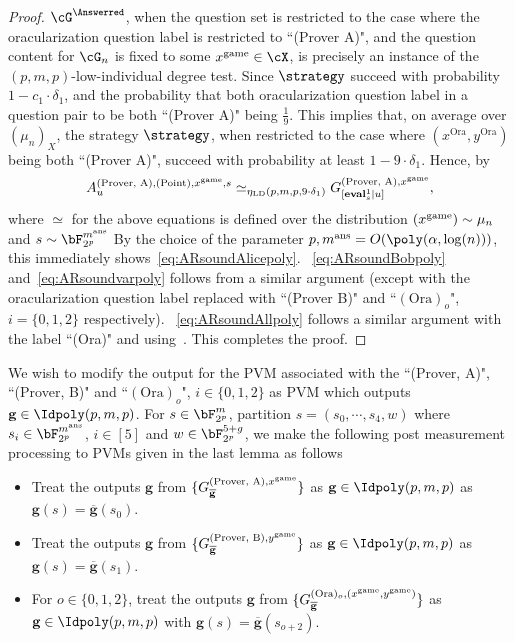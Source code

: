 \begin{proof}
$\cG^{\Answerred}$, when the question set is restricted to the case where the oracularization question label is restricted to ``(Prover A)", and the question content for $\cG_n$ is fixed to some $x^{\game} \in \cX$, is precisely an instance of the $(p,m,p)$-low-individual degree test. Since $\strategy$ succeed with probability $1 - c_1 \cdot \delta_1$, and the probability that both oracularization question label in a question pair to be both ``(Prover A)" being $\frac{1}{9}$. This implies that, on average over $(\mu_n)_X$, the strategy $\strategy$, when restricted to the case where $(x^{\text{Ora}}, y^{\text{Ora}})$ being both ``(Prover A)", succeed with probability at least $1 - 9 \cdot \delta_1$. Hence, by~
\begin{equation*}
 	A^{(\text{Prover, A}), (\text{Point}), x^{\text{game}} ,s}_{u} \simeq_{\mathbf{\eta}_{\text{LD}}(p,m,p,9 \cdot \delta_1)} G_{[\textbf{eval}_{s}^1 | u]}^{(\text{Prover, A}), x^{\text{game}}},
\end{equation*}
where $\simeq$ for the above equations is defined over the distribution $(x^{\text{game}}) \sim \mu_n$ and $s \sim \bF_{2^p}^{m^{\text{ans}}}$
By the choice of the parameter $p, m^{\text{ans}} = O(\poly(\alpha, \log(n)))$, this immediately shows~\eqref{eq:ARsoundAlicepoly}. ~\eqref{eq:ARsoundBobpoly} and~\eqref{eq:ARsoundvarpoly} follows from a similar argument (except with the oracularization question label replaced with ``(Prover B)" and ``$(\text{Ora})_{o}$", $i = \{0,1,2\}$ respectively). ~\eqref{eq:ARsoundAllpoly} follows a similar argument with the label ``(Ora)" and using~. This completes the proof.
\end{proof}
We wish to modify the output for the PVM associated with the ``(Prover, A)", ``(Prover, B)" and ``$(\text{Ora})_{o}$", $i \in \{0,1,2\}$ as PVM which outputs $\textbf{g} \in \Idpoly(p,m,p)$. For $s \in \bF_{2^p}^m$, partition $s = (s_0, \cdots, s_4, w)$ where $s_i \in \bF_{2^p}^{m^{\text{ans}}}$, $i \in [5] $ and $w \in  \bF_{2^p}^{5+g}$, we make the following post measurement processing to PVMs given in the last lemma as follows
\begin{itemize}
	\item Treat the outputs $\textbf{g}$ from $\{G_{\overline{\textbf{g}}}^{(\text{Prover, A}), x^{\text{game}}}\}$ as $\textbf{g} \in \Idpoly(p,m,p)$ as $\textbf{g}(s) =\overline{\textbf{g}}(s_0)$.
	\item Treat the outputs $\textbf{g}$ from $\{G_{\overline{\textbf{g}}}^{(\text{Prover, B}), y^{\text{game}}}\}$ as $\textbf{g} \in \Idpoly(p,m,p)$ as $\textbf{g}(s) =\overline{\textbf{g}}(s_1)$.
	\item For $o \in \{0,1,2\}$, treat the outputs $\textbf{g}$ from $\{G_{\overline{\textbf{g}}}^{(\text{Ora})_{o}, (x^{\text{game}}, y^{\text{game}})}\}$ as $\textbf{g} \in \Idpoly(p,m,p)$ with $\textbf{g}(s) =\overline{\textbf{g}}(s_{o+2})$.
\end{itemize}
